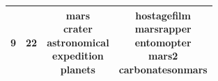 \documentclass{article} %
\begin{document}
\begin{table}[t]
\begin{center}
\begin{tabular}{ | c | c | c | c |}
9 & 22 & \parbox[t]{2cm}{mars \\ crater \\ astronomical \\ expedition \\ planets} & \parbox[t]{8cm}{hostagefilm \\ marsrapper \\ entomopter \\ mars2 \\ carbonatesonmars} \\ \hline 
 
\end{tabular}
\end{center}
\end{table}
\end{document}
